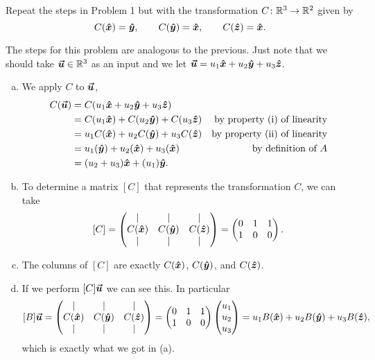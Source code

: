 \documentclass[12pt]{article} %
\begin{document}
\newpage
\begin{problem}
    Repeat the steps in Problem 1 but with the transformation $C\colon \mathbb{R}^3 \to \mathbb{R}^2$ given by
    \[
        C(\boldsymbol{\hat{x}}) = \boldsymbol{\hat{y}}, \qquad C(\boldsymbol{\hat{y}}) = \boldsymbol{\hat{x}}, \qquad C(\boldsymbol{\hat{z}}) = \boldsymbol{\hat{x}}.
    \]
\end{problem}
\begin{solution} The steps for this problem are analogous to the previous. Just note that we should take $\boldsymbol{\boldsymbol{\vec{u}}} \in \mathbb{R}^3$ as an input and we let $\boldsymbol{\boldsymbol{\vec{u}}} = u_1\boldsymbol{\hat{x}} + u_2 \boldsymbol{\hat{y}} + u_3 \boldsymbol{\hat{z}}$. 
    \begin{enumerate}[(a)]
        \item We apply $C$ to $\boldsymbol{\boldsymbol{\vec{u}}}$,
        \begin{align*}
            C(\boldsymbol{\boldsymbol{\vec{u}}}) &= C(u_1 \boldsymbol{\hat{x}} + u_2\boldsymbol{\hat{y}} + u_3 \boldsymbol{\hat{z}})\\
                &= C(u_1\boldsymbol{\hat{x}}) + C(u_2\boldsymbol{\hat{y}}) + C(u_3 \boldsymbol{\hat{z}}) & \textrm{by property (i) of linearity}\\
                &= u_1 C(\boldsymbol{\hat{x}}) + u_2C(\boldsymbol{\hat{y}}) + u_3 C(\boldsymbol{\hat{z}}) & \textrm{by property (ii) of linearity}\\
                &= u_1(\boldsymbol{\hat{y}}) + u_2(\boldsymbol{\hat{x}}) + u_3(\boldsymbol{\hat{x}}) & \textrm{by definition of $A$}\\
                &= (u_2 + u_3)\boldsymbol{\hat{x}} + (u_1)\boldsymbol{\hat{y}}.
        \end{align*}
        \item To determine a matrix $[C]$ that represents the transformation $C$, we can take
        \[
            [C] = \begin{pmatrix} \vert & \vert & \vert \\ C(\boldsymbol{\hat{x}}) & C(\boldsymbol{\hat{y}}) & C(\boldsymbol{\hat{z}}) \\ \vert & \vert & \vert \end{pmatrix} = \begin{pmatrix} 0 & 1 & 1\\ 1 & 0 & 0 \end{pmatrix}.
        \]
        \item The columns of $[C]$ are exactly $C(\boldsymbol{\hat{x}})$, $C(\boldsymbol{\hat{y}})$, and $C(\boldsymbol{\hat{z}})$.
        \item If we perform $[C]\boldsymbol{\boldsymbol{\vec{u}}}$ we can see this. In particular
        \[
            [B]\boldsymbol{\boldsymbol{\vec{u}}} = \begin{pmatrix} \vert & \vert & \vert \\ C(\boldsymbol{\hat{x}}) & C(\boldsymbol{\hat{y}}) & C(\boldsymbol{\hat{z}}) \\ \vert & \vert & \vert \end{pmatrix} = \begin{pmatrix} 0 & 1 & 1\\ 1 & 0 & 0 \end{pmatrix} \begin{pmatrix} u_1 \\ u_2 \\ u_3 \end{pmatrix} = u_1 B(\boldsymbol{\hat{x}}) + u_2 B(\boldsymbol{\hat{y}}) + u_3 B(\boldsymbol{\hat{z}}),
        \]
        which is exactly what we got in (a).
    \end{enumerate}
\end{solution}
\end{document}
